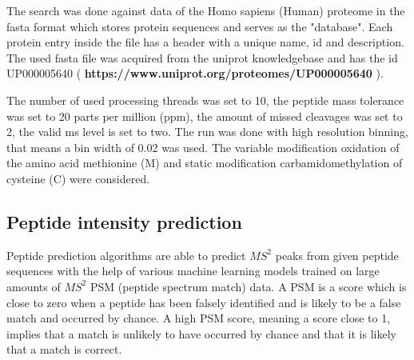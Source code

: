 \documentclass[11pt]{article}
\begin{document}
The search was done against data of the Homo sapiens (Human) proteome in the fasta format which stores protein sequences and serves as the "database". Each protein entry inside the file has a header with a unique name, id and description. The used fasta file was acquired from the uniprot knowledgebase and has the id UP000005640 ( \textbf{https://www.uniprot.org/proteomes/UP000005640} ).

The number of used processing threads was set to 10, the peptide mass tolerance was set to 20 parts per million (ppm), the amount of missed cleavages was set to 2, the valid ms level is set to two. The run was done with high resolution binning, that means a bin width of 0.02 was used. The variable modification oxidation of the amino acid methionine (M) and static modification carbamidomethylation of cysteine (C) were considered.

\subsection{Peptide intensity prediction}
Peptide prediction algorithms are able to predict \(MS^2\) peaks from given peptide sequences with the help of various machine learning models trained on large amounts of \(MS^2\) PSM (peptide spectrum match) data. A PSM is a score which is close to zero when a peptide has been falsely identified and is likely to be a false match and occurred by chance. A high PSM score, meaning a score close to 1, implies that a match is unlikely to have occurred by chance and that it is likely that a match is correct. 
\end{document}

